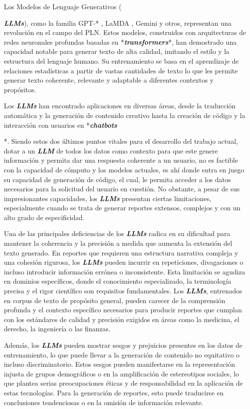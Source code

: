 Los Modelos de Lenguaje Generativos ({\textit{\textbf{LLMs}}), como la familia GPT-* \cite{brown2020language}, LaMDA \cite{thoppilan2022lamda}, Gemini y otros, representan una revolución en el campo del PLN. Estos modelos, construidos con arquitecturas de redes neuronales profundas basadas en *\textit{\textbf{transformers}}*, han demostrado una capacidad notable para generar texto de alta calidad, imitando el estilo y la estructura del lenguaje humano. Su entrenamiento se basa en el aprendizaje de relaciones estadísticas a partir de vastas cantidades de texto lo que les permite generar texto coherente, relevante y adaptable a diferentes contextos y propósitos.
	
Los \textit{\textbf{LLMs}} han encontrado aplicaciones en diversas áreas, desde la traducción automática y la generación de contenido creativo hasta la creación de código y la interacción con usuarios en *\textit{\textbf{chatbots}}}*. Siendo estos dos últimos puntos vitales para el desarrollo del trabajo actual, dotar a un \textit{\textbf{LLM}} de todos los datos como contexto para que este genere información y permita dar una respuesta coherente a un usuario, no es factible con la capacidad de cómputo y los modelos actuales, es ahí donde entra en juego su capacidad de generación de código, el cual, le permita acceder a los datos necesarios para la solicitud del usuario en cuestión. No obstante, a pesar de sus impresionantes capacidades, los \textit{\textbf{LLMs}} presentan ciertas limitaciones, especialmente cuando se trata de generar reportes extensos, complejos y con un alto grado de especificidad.

Una de las principales deficiencias de los \textit{\textbf{LLMs}} radica en su dificultad para mantener la coherencia y la precisión a medida que aumenta la extensión del texto generado. En reportes que requieren una estructura narrativa compleja y una cohesión rigurosa, los \textit{\textbf{LLMs}} pueden incurrir en repeticiones, divagaciones o incluso introducir información errónea o inconsistente. Esta limitación se agudiza en dominios específicos, donde el conocimiento especializado, la terminología precisa y el rigor científico son requisitos fundamentales. Los \textit{\textbf{LLMs}}, entrenados en corpus de texto de propósito general, pueden carecer de la comprensión profunda y el contexto específico necesarios para producir reportes que cumplan con los estándares de calidad y precisión exigidos en áreas como la medicina, el derecho, la ingeniería o las finanzas.

Además, los \textit{\textbf{LLMs}} pueden mostrar sesgos y prejuicios presentes en los datos de entrenamiento, lo que puede llevar a la generación de contenido no equitativo o incluso discriminatorio. Estos sesgos pueden manifestarse en la representación injusta de grupos demográficos o en la amplificación de estereotipos sociales, lo que plantea serias preocupaciones éticas y de responsabilidad en la aplicación de estas tecnologías. Para la generación de reportes, esto puede traducirse en conclusiones tendenciosas o en la omisión de información relevante.

